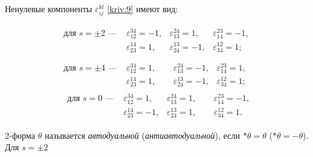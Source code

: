 Ненулевые компоненты $\varepsilon

_{ij}^{kl}$ \eqref{kriv:9} имеют вид:

\begin{gather}

\begin{array}{llll}

\text{для }s = \pm 2 \text{ --- }  & 

\varepsilon _{12}^{34}=-1, & \varepsilon _{13}^{24}=1, & \varepsilon _{14}^{23}=-1, \\ & 

\varepsilon _{23}^{14}=1,  & \varepsilon _{24}^{13}=-1, & \varepsilon _{34}^{12}=1; \\

\end{array}~~

\\

\begin{array}{llll}

\text{для }s = \pm 4 \text{ --- } & 

\varepsilon _{12}^{34}=1,\phantom{-} & \varepsilon _{13}^{24}=-1, & \varepsilon _{14}^{23}=1, \\ & 

\varepsilon _{23}^{14}=1, & \varepsilon _{24}^{13}=-1, & \varepsilon _{34}^{12}=1;  

\end{array}~~~ \label{kriv:12} 

\\

~~\begin{array}{llll}

\text{для }s = 0 \text{ --- }  &

\varepsilon _{12}^{34}=1, & \varepsilon _{13}^{24}=1,\phantom{-} &\varepsilon _{14}^{23}=-1,\\ &

\varepsilon _{23}^{14}=-1, & \varepsilon _{24}^{13}=1, & \varepsilon _{34}^{12}=1.  

\end{array} 

\label{kriv:13}

\end{gather}



2-форма $\theta $ называется \textit{автодуальной }(\textit{антиавтодуальной}), если $\ast

\theta =\theta $ ($\ast \theta =-\theta $). Для $s=\pm 2$ 

